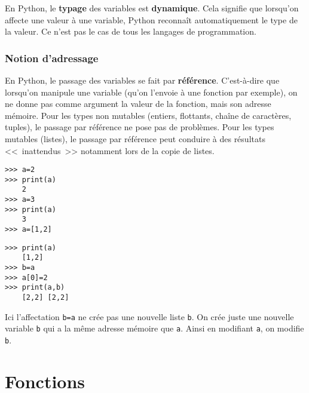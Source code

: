 \begin{rem}
En Python, le \textbf{typage} des variables est \textbf{dynamique}. Cela signifie que lorsqu'on affecte une valeur à une variable, Python reconnaît automatiquement le type de la valeur. Ce n'est pas le cas de tous les langages de programmation.

\end{rem}
\subsubsection*{Notion d'adressage}

En Python, le passage des variables se fait par \textbf{référence}. C'est-à-dire que lorsqu'on manipule une variable (qu'on l'envoie à une fonction par exemple), on ne donne pas comme argument la valeur de la fonction, mais son adresse mémoire. Pour les types non mutables (entiers, flottants, chaîne de caractères, tuples), le passage par référence ne pose pas de problèmes. Pour les types mutables (listes), le passage par référence peut conduire à des résultats <<~inattendus~>> notamment lors de la copie de listes. 


\begin{multicols}{2}
\begin{lstlisting}
>>> a=2
>>> print(a)
	2
>>> a=3
>>> print(a)
	3
>>> a=[1,2]
\end{lstlisting}

\begin{lstlisting}
>>> print(a)
	[1,2]
>>> b=a
>>> a[0]=2
>>> print(a,b)
	[2,2] [2,2]
\end{lstlisting}
\end{multicols}
Ici l'affectation \texttt{b=a} ne crée pas une nouvelle liste \texttt{b}. On crée juste une nouvelle variable \texttt{b} qui a la même adresse mémoire que \texttt{a}. Ainsi en modifiant \texttt{a}, on modifie \texttt{b}. 







\section{Fonctions}
